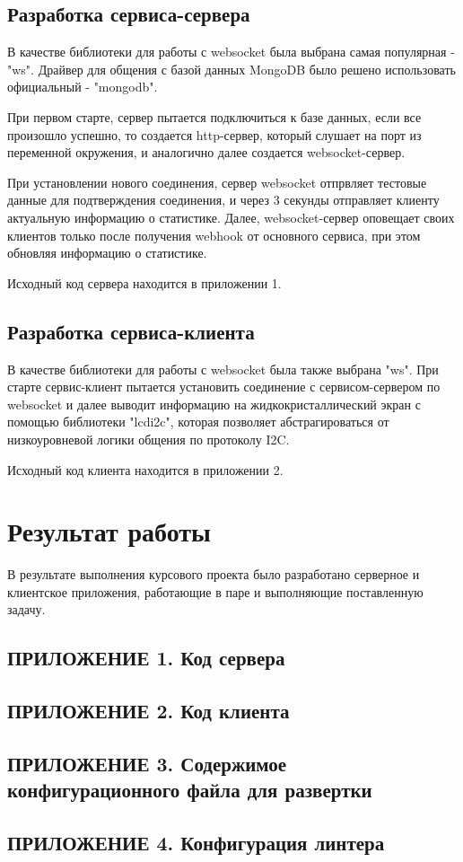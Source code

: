\documentclass[a4paper, 12pt]{article}
\begin{document}
    \subsection*{Разработка сервиса-сервера}
    В качестве библиотеки для работы с websocket была выбрана самая популярная - "ws". Драйвер для общения с базой
    данных MongoDB было решено использовать официальный - "mongodb".

    При первом старте, сервер пытается подключиться к базе данных, если все произошло успешно, то создается http-сервер,
    который слушает на порт из переменной окружения, и аналогично далее создается websocket-сервер.

    При установлении нового соединения, сервер websocket отпрвляет тестовые данные для подтверждения соединения,
    и через 3 секунды отправляет клиенту актуальную информацию о статистике. Далее, websocket-сервер оповещает
    своих клиентов только после получения webhook от основного сервиса, при этом обновляя информацию о статистике.

    Исходный код сервера находится в приложении 1.

    \subsection*{Разработка сервиса-клиента}
    В качестве библиотеки для работы с websocket была также выбрана "ws". При старте сервис-клиент пытается установить
    соединение с сервисом-сервером по websocket и далее выводит информацию на жидкокристаллический экран с помощью библиотеки
    "lcdi2c", которая позволяет абстрагироваться от низкоуровневой логики общения по протоколу I2C.

    Исходный код клиента находится в приложении 2.

    \section*{Результат работы}
    В результате выполнения курсового проекта было разработано серверное и клиентское приложения,
    работающие в паре и выполняющие поставленную задачу.

    \newpage
    \subsection*{ПРИЛОЖЕНИЕ 1. Код сервера}
    

    \newpage
    \subsection*{ПРИЛОЖЕНИЕ 2. Код клиента}
    

    \newpage
    \subsection*{ПРИЛОЖЕНИЕ 3. Содержимое конфигурационного файла для развертки}
    

    \newpage
    \subsection*{ПРИЛОЖЕНИЕ 4. Конфигурация линтера}
    
\end{document}
